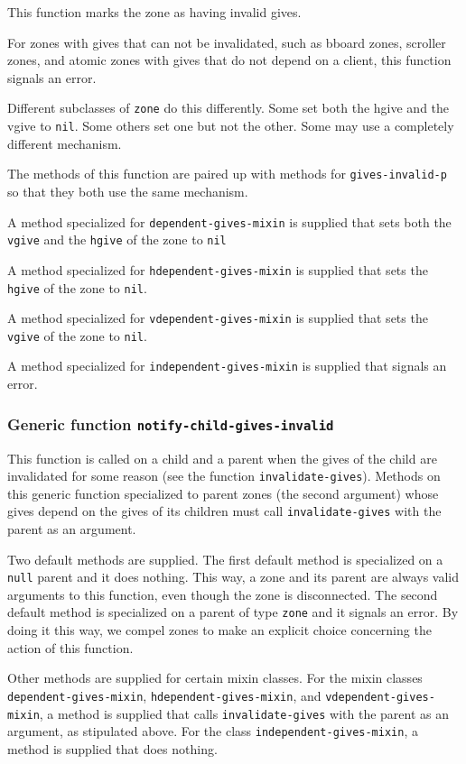 \documentclass{report}
\begin{document}
This function marks the zone as having invalid gives.  

For zones with gives that can not be invalidated, such as bboard
zones, scroller zones, and atomic zones with gives that do not depend
on a client, this function signals an error.

Different subclasses of \texttt{zone} do this differently.  Some set
both the hgive and the vgive to \texttt{nil}.  Some others set one but
not the other.  Some may use a completely different mechanism.

The methods of this function are paired up with methods for
\texttt{gives-invalid-p} so that they both use the same mechanism.

A method specialized for \texttt{dependent-gives-mixin} is supplied
that sets both the \texttt{vgive} and the \texttt{hgive} of the zone
to \texttt{nil}

A method specialized for \texttt{hdependent-gives-mixin} is supplied
that sets the \texttt{hgive} of the zone to \texttt{nil}.

A method specialized for \texttt{vdependent-gives-mixin} is supplied
that sets the \texttt{vgive} of the zone to \texttt{nil}.

A method specialized for \texttt{independent-gives-mixin} is supplied
that signals an error.

\subsubsection{Generic function \texttt{notify-child-gives-invalid}}
\label{generic-function-notify-child-gives-invalid}

This function is called on a child and a parent when the gives of the
child are invalidated for some reason (see the function
\texttt{invalidate-gives}).  Methods on this generic function
specialized to parent zones (the second argument) whose gives depend
on the gives of its children must call \texttt{invalidate-gives} with
the parent as an argument.

Two default methods are supplied.  The first default method is
specialized on a \texttt{null} parent and it does nothing.  This way,
a zone and its parent are always valid arguments to this function,
even though the zone is disconnected.  The second default method is
specialized on a parent of type \texttt{zone} and it signals an error.
By doing it this way, we compel zones to make an explicit choice
concerning the action of this function.

Other methods are supplied for certain mixin classes.  For the mixin
classes \texttt{dependent-gives-mixin},
\texttt{hdependent-gives-mixin}, and \texttt{vdependent-gives-mixin},
a method is supplied that calls \texttt{invalidate-gives} with the
parent as an argument, as stipulated above.  For the class
\texttt{independent-gives-mixin}, a method is supplied that does
nothing.
\end{document}
